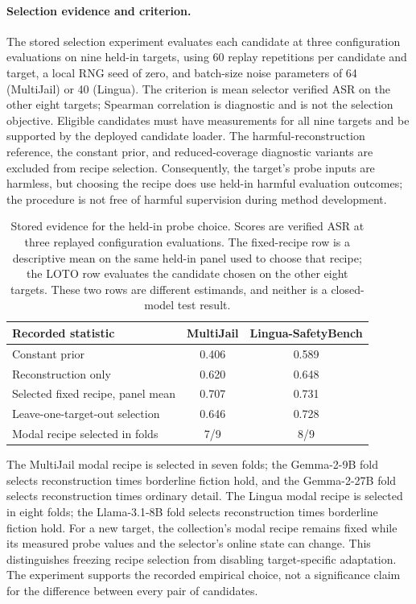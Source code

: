 \paragraph{Selection evidence and criterion.}
The stored selection experiment evaluates each candidate at three configuration evaluations on nine held-in targets, using 60 replay repetitions per candidate and target, a local RNG seed of zero, and batch-size noise parameters of 64 (MultiJail) or 40 (Lingua). The criterion is mean selector verified ASR on the other eight targets; Spearman correlation is diagnostic and is not the selection objective. Eligible candidates must have measurements for all nine targets and be supported by the deployed candidate loader. The harmful-reconstruction reference, the constant prior, and reduced-coverage diagnostic variants are excluded from recipe selection. Consequently, the target's probe inputs are harmless, but choosing the recipe does use held-in harmful evaluation outcomes; the procedure is not free of harmful supervision during method development.

\begin{table}[t]\centering\small
\caption{Stored evidence for the held-in probe choice. Scores are verified ASR at three replayed configuration evaluations. The fixed-recipe row is a descriptive mean on the same held-in panel used to choose that recipe; the LOTO row evaluates the candidate chosen on the other eight targets. These two rows are different estimands, and neither is a closed-model test result.}
\label{tab:heldin-probe-evidence}
\begin{tabular}{lcc}\toprule
Recorded statistic & MultiJail & Lingua-SafetyBench \\\midrule
Constant prior & 0.406 & 0.589 \\
Reconstruction only & 0.620 & 0.648 \\
Selected fixed recipe, panel mean & 0.707 & 0.731 \\
Leave-one-target-out selection & 0.646 & 0.728 \\
Modal recipe selected in folds & 7/9 & 8/9 \\
\bottomrule\end{tabular}
\end{table}

The MultiJail modal recipe is selected in seven folds; the Gemma-2-9B fold selects reconstruction times borderline fiction hold, and the Gemma-2-27B fold selects reconstruction times ordinary detail. The Lingua modal recipe is selected in eight folds; the Llama-3.1-8B fold selects reconstruction times borderline fiction hold. For a new target, the collection's modal recipe remains fixed while its measured probe values and the selector's online state can change. This distinguishes freezing recipe selection from disabling target-specific adaptation. The experiment supports the recorded empirical choice, not a significance claim for the difference between every pair of candidates.


